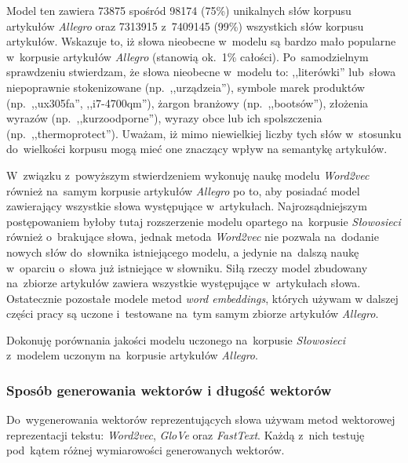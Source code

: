 \documentclass[pl]{minipw} %
\begin{document}
Model ten zawiera 73875 spośród 98174 (75\%) unikalnych słów korpusu artykułów \textit{Allegro} oraz 7313915 z~7409145 (99\%) wszystkich słów korpusu artykułów. Wskazuje to, iż słowa nieobecne w~modelu są bardzo mało popularne w~korpusie artykułów \textit{Allegro} (stanowią ok.~1\% całości). Po~samodzielnym sprawdzeniu stwierdzam, że słowa nieobecne w~modelu to: ,,literówki'' lub~słowa niepoprawnie stokenizowane (np.~,,urządzeia''), symbole marek produktów (np.~,,ux305fa'', ,,i7-4700qm''), żargon branżowy (np.~,,bootsów''), złożenia wyrazów (np.~,,kurzoodporne''), wyrazy obce lub ich spolszczenia (np.~,,thermoprotect''). Uważam, iż mimo niewielkiej liczby tych słów w~stosunku do~wielkości korpusu mogą mieć one znaczący wpływ na semantykę artykułów.

W~związku z~powyższym stwierdzeniem wykonuję naukę modelu \textit{Word2vec} również na~samym korpusie artykułów \textit{Allegro} po to, aby posiadać model zawierający wszystkie słowa występujące w~artykułach. Najrozsądniejszym postępowaniem byłoby tutaj rozszerzenie modelu opartego na~korpusie \textit{Słowosieci} również o~brakujące słowa, jednak metoda \textit{Word2vec} nie pozwala na~dodanie nowych słów do~słownika istniejącego modelu, a jedynie na~dalszą naukę w~oparciu o~słowa już istniejące w słowniku. Siłą rzeczy model zbudowany na~zbiorze artykułów zawiera wszystkie występujące w~artykułach słowa. Ostatecznie pozostałe modele metod \textit{word embeddings}, których używam w dalszej części pracy są uczone i~testowane na~tym samym zbiorze artykułów \textit{Allegro}.

Dokonuję porównania jakości modelu uczonego na~korpusie \textit{Słowosieci} z~modelem uczonym na~korpusie artykułów \textit{Allegro}.

\subsubsection{Sposób generowania wektorów i długość wektorów}
Do~wygenerowania wektorów reprezentujących słowa używam metod wektorowej reprezentacji tekstu: \textit{Word2vec}, \textit{GloVe} oraz \textit{FastText}. Każdą z~nich testuję pod~kątem różnej wymiarowości generowanych wektorów.
\end{document}
